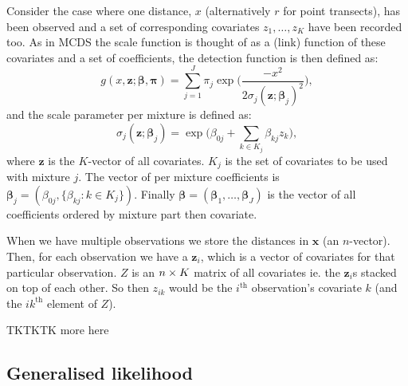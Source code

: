 Consider the case where one distance, $x$ (alternatively $r$ for point transects), has been observed and a set of corresponding covariates $z_1,\dots,z_K$ have been recorded too. As in MCDS the scale function is thought of as a (link) function of these covariates and a set of coefficients, the detection function is then defined as:
\begin{equation*}
g(x, \bm{z};\bm{\beta},\bm{\pi}) = \sum_{j=1}^J \pi_j \exp \Big( \frac{-x^2}{2 \sigma_j(\bm{z};\bm{\beta}_j)^2}\Big),
\label{mmds-detfct-covar}
\end{equation*}
and the scale parameter per mixture is defined as:
\begin{equation*}
\sigma_j(\bm{z};\bm{\beta}_j) = \exp \Big(\beta_{0j} + \sum_{k\in K_j} \beta_{kj} z_k \Big),
\end{equation*}
where $\bm{z}$ is the $K$-vector of all covariates. $K_j$ is the set of covariates to be used with mixture $j$. The vector of per mixture coefficients is $\bm{\beta}_j=(\beta_{0j},\{ \beta_{kj} : k \in K_j\})$. Finally $\bm{\beta}=(\bm{\beta}_1,\dots,\bm{\beta}_J)$ is the vector of all coefficients ordered by mixture part then covariate.

When we have multiple observations we store the distances in $\bm{x}$ (an $n$-vector). Then, for each observation we have a $\bm{z}_i$, which is a vector of covariates for that particular observation. $Z$ is an $n \times K$ matrix of all covariates ie. the $\bm{z}_i$s stacked on top of each other. So then $z_{ik}$ would be the $i^\text{th}$ observation's covariate $k$ (and the $ik^\text{th}$ element of $Z$).

TKTKTK more here

%
%

\subsection{Generalised likelihood}
\label{ds-genlik}

